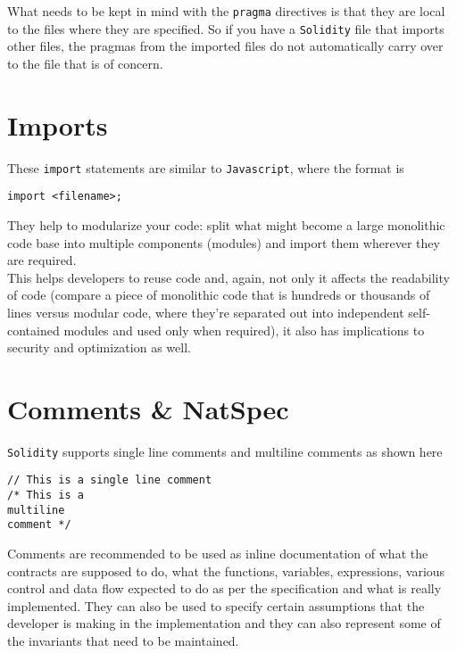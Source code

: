What needs to be kept in mind with the \texttt{pragma} directives is that they are local to the files where they are specified.
So if you have a \texttt{Solidity} file that imports other files, the pragmas from the imported files do not automatically carry over to the file that is of concern.

\section{Imports}

These \texttt{import} statements are similar to \texttt{Javascript}, where the format is

\begin{lstlisting}[language=Solidity, style=solStyle, caption={Example of import statement}]
import <filename>;
\end{lstlisting}

They help to modularize your code: split what might become a large monolithic code base into multiple components (modules) and import them wherever they are required.\\

This helps developers to reuse code and, again, not only it affects the readability of code (compare a piece of monolithic code that is hundreds or thousands of lines versus modular code, where they're separated out into independent self-contained modules and used only when required), it also has implications to security and optimization as well.

\section{Comments \& NatSpec}

\texttt{Solidity} supports single line comments and multiline comments as shown here

\begin{lstlisting}[language=Solidity, style=solStyle, caption={Example of comments}]
// This is a single line comment
/* This is a 
multiline
comment */
\end{lstlisting}

Comments are recommended to be used as inline documentation of what the contracts are supposed to do, what the functions, variables, expressions, various control and data flow expected to do as per the specification and what is really implemented.
They can also be used to specify certain assumptions that the developer is making in the implementation and they can also represent some of the invariants that need to be maintained.\\

